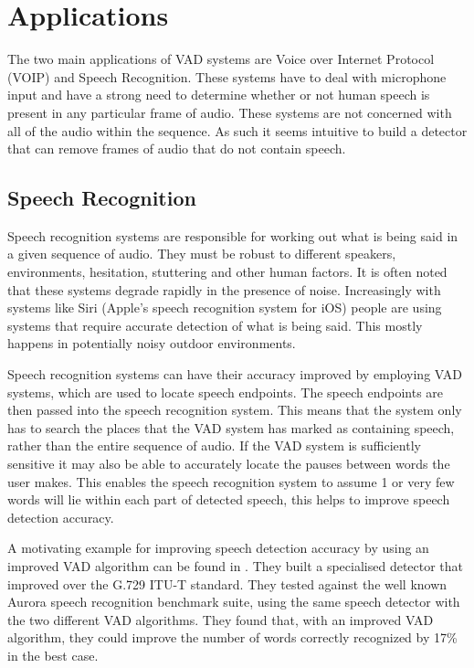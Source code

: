 \documentclass[ %
                    author={Sam Phippen},
                supervisor={Dr. Rafal Bogacz},
                     title={Real time voice activity detectors in noisy personal computing environments},
                  subtitle={},
                    degree={MEng},
                      year={2012} ]{thesis}
\begin{document}
\section{Applications}

The two main applications of VAD systems are Voice over Internet Protocol
(VOIP) and Speech Recognition. These systems have to deal with microphone input
and have a strong need to determine whether or not human speech is present in
any particular frame of audio. These systems are not concerned with all of the
audio within the sequence. As such it seems intuitive to build a detector that
can remove frames of audio that do not contain speech.

\subsection{Speech Recognition}

Speech recognition systems are responsible for working out what is being said
in a given sequence of audio. They must be robust to different speakers,
environments, hesitation, stuttering and other human factors. It is often noted
that these systems degrade rapidly in the presence of noise\cite{Moreno}.
Increasingly with systems like Siri\texttrademark\cite{siri} (Apple's speech
recognition system for iOS\texttrademark) people are using systems that require
accurate detection of what is being said. This mostly happens in potentially
noisy outdoor environments.

Speech recognition systems can have their accuracy improved\cite{shin} by
employing VAD systems, which are used to locate speech endpoints. The speech
endpoints are then passed into the speech recognition system. This means that
the system only has to search the places that the VAD system has marked as
containing speech, rather than the entire sequence of audio. If the VAD system
is sufficiently sensitive it may also be able to accurately locate the pauses
between words the user makes. This enables the speech recognition system to
assume 1 or very few words will lie within each part of detected speech, this
helps to improve speech detection accuracy.

A motivating example for improving speech detection accuracy by using an
improved VAD algorithm can be found in \cite{ramirez-2}. They built a
specialised detector that improved over the G.729 ITU-T\cite{itut} standard.
They tested against the well known Aurora\cite{aurora} speech recognition
benchmark suite, using the same speech detector with the two different VAD
algorithms. They found that, with an improved VAD algorithm, they could improve
the number of words correctly recognized by 17\% in the best case.
\end{document}
